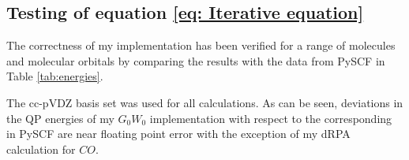 \documentclass[12pt]{caltech_thesis}
\begin{document}
\subsection{Testing of equation \ref{eq: Iterative equation}}
The correctness of my implementation has been verified for a range of molecules and molecular orbitals by comparing the results with the data from PySCF in Table \ref{tab:energies}.
\begin{table}[h]
\centering
\caption{Tests of my dRPA and dTDA implementations of $G_0W_0$. Energy deviations (in eV) for my implementation of $G_0W_0$ with dTDA and dRPA for different molecules across a range of orbitals compared to PySCF.}
\label{tab:energies}
\end{table}


The cc-pVDZ basis set was used for all calculations. As can be seen, deviations in the QP energies of my $G_0W_0$ implementation with respect to the corresponding in PySCF are near floating point error with the exception of my dRPA calculation for $CO$.
\end{document}
